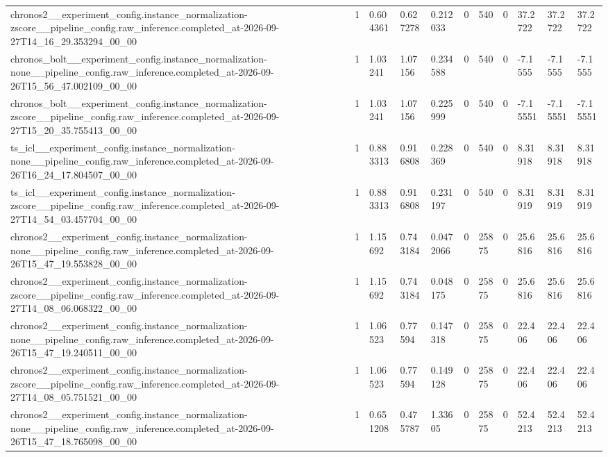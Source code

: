\begin{tabular}{lllllllllll}
chronos2\_\_experiment\_config.instance\_normalization-zscore\_\_pipeline\_config.raw\_inference.completed\_at-2026-09-27T14\_16\_29.353294\_00\_00 & 1 & 0.604361 & 0.627278 & 0.212033 & 0 & 540 & 0 & 37.2722 & 37.2722 & 37.2722 \\
chronos\_bolt\_\_experiment\_config.instance\_normalization-none\_\_pipeline\_config.raw\_inference.completed\_at-2026-09-26T15\_56\_47.002109\_00\_00 & 1 & 1.03241 & 1.07156 & 0.234588 & 0 & 540 & 0 & -7.1555 & -7.1555 & -7.1555 \\
chronos\_bolt\_\_experiment\_config.instance\_normalization-zscore\_\_pipeline\_config.raw\_inference.completed\_at-2026-09-27T15\_20\_35.755413\_00\_00 & 1 & 1.03241 & 1.07156 & 0.225999 & 0 & 540 & 0 & -7.15551 & -7.15551 & -7.15551 \\
ts\_icl\_\_experiment\_config.instance\_normalization-none\_\_pipeline\_config.raw\_inference.completed\_at-2026-09-26T16\_24\_17.804507\_00\_00 & 1 & 0.883313 & 0.916808 & 0.228369 & 0 & 540 & 0 & 8.31918 & 8.31918 & 8.31918 \\
ts\_icl\_\_experiment\_config.instance\_normalization-zscore\_\_pipeline\_config.raw\_inference.completed\_at-2026-09-27T14\_54\_03.457704\_00\_00 & 1 & 0.883313 & 0.916808 & 0.231197 & 0 & 540 & 0 & 8.31919 & 8.31919 & 8.31919 \\
chronos2\_\_experiment\_config.instance\_normalization-none\_\_pipeline\_config.raw\_inference.completed\_at-2026-09-26T15\_47\_19.553828\_00\_00 & 1 & 1.15692 & 0.743184 & 0.0472066 & 0 & 25875 & 0 & 25.6816 & 25.6816 & 25.6816 \\
chronos2\_\_experiment\_config.instance\_normalization-zscore\_\_pipeline\_config.raw\_inference.completed\_at-2026-09-27T14\_08\_06.068322\_00\_00 & 1 & 1.15692 & 0.743184 & 0.048175 & 0 & 25875 & 0 & 25.6816 & 25.6816 & 25.6816 \\
chronos2\_\_experiment\_config.instance\_normalization-none\_\_pipeline\_config.raw\_inference.completed\_at-2026-09-26T15\_47\_19.240511\_00\_00 & 1 & 1.06523 & 0.77594 & 0.147318 & 0 & 25875 & 0 & 22.406 & 22.406 & 22.406 \\
chronos2\_\_experiment\_config.instance\_normalization-zscore\_\_pipeline\_config.raw\_inference.completed\_at-2026-09-27T14\_08\_05.751521\_00\_00 & 1 & 1.06523 & 0.77594 & 0.149128 & 0 & 25875 & 0 & 22.406 & 22.406 & 22.406 \\
chronos2\_\_experiment\_config.instance\_normalization-none\_\_pipeline\_config.raw\_inference.completed\_at-2026-09-26T15\_47\_18.765098\_00\_00 & 1 & 0.651208 & 0.475787 & 1.33605 & 0 & 25875 & 0 & 52.4213 & 52.4213 & 52.4213 \\

\end{tabular}
